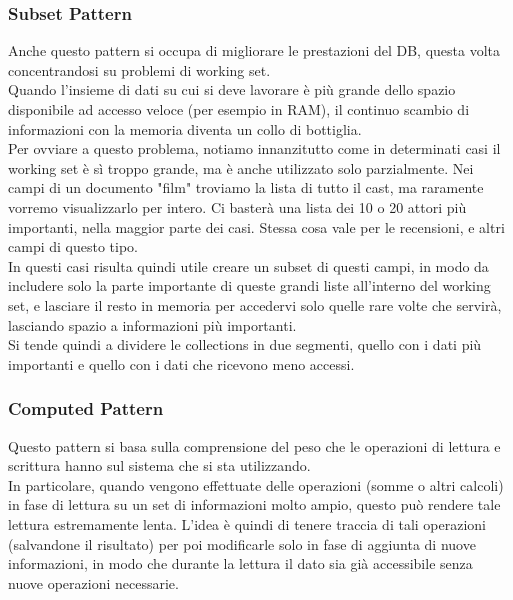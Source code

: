 \subsubsection{Subset Pattern}
Anche questo pattern si occupa di migliorare le prestazioni del DB, questa volta concentrandosi su problemi di working set.\\
Quando l'insieme di dati su cui si deve lavorare è più grande dello spazio disponibile ad accesso veloce (per esempio in RAM), il continuo scambio di informazioni con la memoria diventa un collo di bottiglia.\\
Per ovviare a questo problema, notiamo innanzitutto come in determinati casi il working set è sì troppo grande, ma è anche utilizzato solo parzialmente. Nei campi di un documento "film" troviamo la lista di tutto il cast, ma raramente vorremo visualizzarlo per intero. Ci basterà una lista dei 10 o 20 attori più importanti, nella maggior parte dei casi. Stessa cosa vale per le recensioni, e altri campi di questo tipo.\\
In questi casi risulta quindi utile creare un subset di questi campi, in modo da includere solo la parte importante di queste grandi liste all'interno del working set, e lasciare il resto in memoria per accedervi solo quelle rare volte che servirà, lasciando spazio a informazioni più importanti.\\
Si tende quindi a dividere le collections in due segmenti, quello con i dati più importanti e quello con i dati che ricevono meno accessi.\\

\subsubsection{Computed Pattern}
Questo pattern si basa sulla comprensione del peso che le operazioni di lettura e scrittura hanno sul sistema che si sta utilizzando.\\
In particolare, quando vengono effettuate delle operazioni (somme o altri calcoli) in fase di lettura su un set di informazioni molto ampio, questo può rendere tale lettura estremamente lenta. L'idea è quindi di tenere traccia di tali operazioni (salvandone il risultato) per poi modificarle solo in fase di aggiunta di nuove informazioni, in modo che durante la lettura il dato sia già accessibile senza nuove operazioni necessarie.\\

